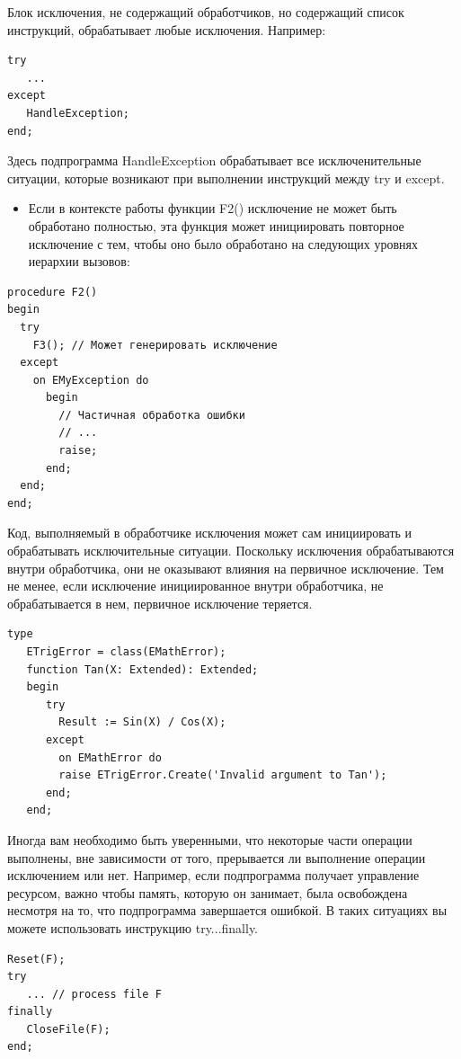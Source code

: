 \documentclass[xcolor=table]{beamer}
\begin{document}
\begin{frame}[fragile]
	Блок исключения, не содержащий обработчиков, но содержащий список инструкций, обрабатывает любые исключения. Например:
	\begin{verbatim}
try
   ...
except
   HandleException;
end;
	\end{verbatim}
	Здесь подпрограмма HandleException обрабатывает все исключенительные ситуации, которые возникают при выполнении инструкций между try и except.
\end{frame}

\begin{frame}[fragile]
	\begin{itemize}
		\item Если в контексте работы функции F2() исключение не может быть обработано полностью, эта функция может инициировать повторное исключение с тем, чтобы оно было обработано на следующих уровнях иерархии вызовов:
	\end{itemize}
	\begin{verbatim}
procedure F2()
begin
  try 
    F3(); // Может генерировать исключение
  except
    on EMyException do 
      begin 
        // Частичная обработка ошибки
        // ...
        raise;
      end;
  end;
end;
	\end{verbatim}
\end{frame}

\begin{frame}[fragile]
	Код, выполняемый в обработчике исключения может сам инициировать и обрабатывать исключительные ситуации. Поскольку исключения обрабатываются внутри обработчика, они не оказывают влияния на первичное исключение. Тем не менее, если исключение инициированное внутри обработчика, не обрабатывается в нем, первичное исключение теряется.
	\begin{verbatim}
type
   ETrigError = class(EMathError);
   function Tan(X: Extended): Extended;
   begin
      try
        Result := Sin(X) / Cos(X);
      except
        on EMathError do
        raise ETrigError.Create('Invalid argument to Tan');
      end;
   end;
	\end{verbatim}
\end{frame}

\begin{frame}[fragile]
	Иногда вам необходимо быть уверенными, что некоторые части операции выполнены, вне зависимости от того, прерывается ли выполнение операции исключением или нет. Например, если подпрограмма получает управление ресурсом, важно чтобы память, которую он занимает, была освобождена несмотря на то, что подпрограмма завершается ошибкой. В таких ситуациях вы можете использовать инструкцию try...finally.
	\begin{verbatim}
Reset(F);
try
   ... // process file F
finally
   CloseFile(F);
end;
	\end{verbatim}
\end{frame}
\end{document}
